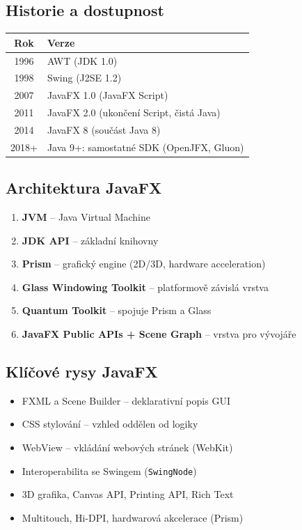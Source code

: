 \documentclass[11pt,a4paper]{article}
\begin{document}
\subsection{Historie a dostupnost}

\begin{center}
\begin{tabular}{cl}
\toprule
\textbf{Rok} & \textbf{Verze} \\
\midrule
1996 & AWT (JDK 1.0) \\
1998 & Swing (J2SE 1.2) \\
2007 & JavaFX 1.0 (JavaFX Script) \\
2011 & JavaFX 2.0 (ukončení Script, čistá Java) \\
2014 & JavaFX 8 (součást Java 8) \\
2018+ & Java 9+: samostatné SDK (OpenJFX, Gluon) \\
\bottomrule
\end{tabular}
\end{center}

\subsection{Architektura JavaFX}

\begin{tcolorbox}[defbox,title=Hierarchie vrstev (odspoda nahoru)]
\begin{enumerate}
    \item \textbf{JVM} -- Java Virtual Machine
    \item \textbf{JDK API} -- základní knihovny
    \item \textbf{Prism} -- grafický engine (2D/3D, hardware acceleration)
    \item \textbf{Glass Windowing Toolkit} -- platformově závislá vrstva
    \item \textbf{Quantum Toolkit} -- spojuje Prism a Glass
    \item \textbf{JavaFX Public APIs + Scene Graph} -- vrstva pro vývojáře
\end{enumerate}
\end{tcolorbox}

\subsection{Klíčové rysy JavaFX}

\begin{itemize}
    \item FXML a Scene Builder -- deklarativní popis GUI
    \item CSS stylování -- vzhled oddělen od logiky
    \item WebView -- vkládání webových stránek (WebKit)
    \item Interoperabilita se Swingem (\texttt{SwingNode})
    \item 3D grafika, Canvas API, Printing API, Rich Text
    \item Multitouch, Hi-DPI, hardwarová akcelerace (Prism)
\end{itemize}
\end{document}
